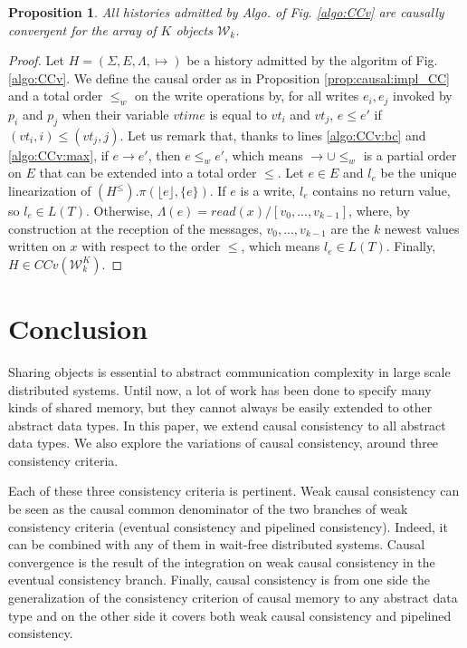 \documentclass[9pt,numbers]{sigplanconf}
\newtheorem{proposition}{Proposition}
\begin{document}
\begin{proposition}\label{prop:causal:impl_CCv}
  All histories admitted by Algo. of Fig. \ref{algo:CCv} are causally convergent for the array of $K$ objects $\mathscr{W}_k$.
\end{proposition}
\begin{proof}
  Let $H=(\Sigma, E, \Lambda, \mapsto)$ be a history admitted by the algoritm of Fig. \ref{algo:CCv}. 
  We define the causal order as in Proposition \ref{prop:causal:impl_CC} and a total order $\le_w$
  on the write operations by, for all writes $e_i, e_j$ invoked by $p_i$ and $p_j$ when their 
  variable $vtime$ is equal to $vt_i$ and $vt_j$, $e\le e'$ if $(vt_i, i) \le (vt_j,j)$. 
  Let us remark that, thanks to lines \ref{algo:CCv:bc} and \ref{algo:CCv:max}, 
  if $e\rightarrow e'$, then $e\le_w e'$, which means $\rightarrow\cup \le_w$ is a 
  partial order on $E$ that can be extended into a total order $\le$.
  Let $e \in E$ and $l_e$ be the unique linearization of $(H^\le).\pi(\lfloor e\rfloor, \{e\})$. If $e$ is a write,
  $l_e$ contains no return value, so $l_e\in L(T)$. Otherwise, $\Lambda(e) = read(x)/[v_0, ..., v_{k-1}]$, where,
  by construction at the reception of the messages, $v_0, ..., v_{k-1}$ are the $k$ newest values written on $x$ 
  with respect to the order $\le$, which means $l_e\in L(T)$. Finally, $H\in CCv(\mathscr{W}_k^K)$. 
\end{proof}




\section{Conclusion}\label{section:conclusion}


Sharing objects is essential to abstract communication complexity 
in large scale distributed systems. Until now, a lot of work has been done
to specify many kinds of shared memory, but they cannot always be easily 
extended to other abstract data types. In this paper, we extend causal 
consistency to all abstract data types. We also explore the variations
of causal consistency, around three consistency criteria.

Each of these three consistency criteria is pertinent. Weak causal consistency can be seen as the causal common denominator of the two branches of weak consistency criteria (eventual consistency and pipelined consistency). Indeed, it can be combined with any of them in wait-free distributed systems. Causal convergence is the result of the integration on weak causal consistency in the eventual consistency branch. Finally, causal consistency is from one side the generalization of the consistency criterion of causal memory to any abstract data type and on the other side it covers both weak causal consistency and pipelined consistency. 
\end{document}
